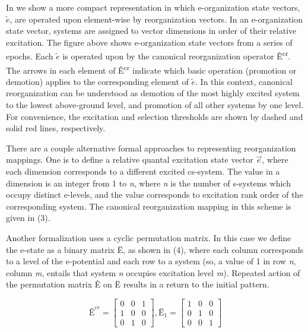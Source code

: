   In {} we show a more compact representation in which e-organization state vectors,  $\widetilde{{e}}$, are operated upon element-wise by reorganization vectors. In an e-organization state vector, systems are assigned to vector dimensions in order of their relative excitation. The figure above shows e-organization state vectors from a series of epochs. Each  $\widetilde{{e}}$ is operated upon by the canonical reorganization operator Ê\textsuperscript{cr}. The arrows in each element of Ê\textsuperscript{cr} indicate which basic operation (promotion or demotion) applies to the corresponding element of  $\widetilde{{e}}$. In this context, canonical reorganization can be understood as demotion of the most highly excited system to the lowest above-ground level, and promotion of all other systems by one level. For convenience, the excitation and selection thresholds are shown by dashed and solid red lines, respectively.

  There are a couple alternative formal approaches to representing reorganization mappings. One is to define a relative quantal excitation state vector  $\overrightarrow{{e}}$, where each dimension corresponds to a different excited cs-system. The value in a dimension is an integer from 1 to \textit{n}, where \textit{n} is the number of s-systems which occupy distinct e-levels, and the value corresponds to excitation rank order of the corresponding system. The canonical reorganization mapping in this scheme is given in (3).


  Another formalization uses a cyclic permutation matrix. In this case we define the e-state as a binary matrix Ë, as shown in (4), where each column corresponds to a level of the e-potential and each row to a system (so, a value of 1 in row \textit{n}, column \textit{m}, entails that system \textit{n} occupies excitation level \textit{m}). Repeated action of the permutation matrix Ê on Ë results in a return to the initial pattern. 

\ea
$$
\text{Ê}^{{cr}}=
\left[
  \begin{matrix}
  0 & 0 & 1\\
  1 & 0 & 0\\
  0 & 1 & 0
  \end{matrix}
\right],
{\text{Ë}}_{1}=
\left[
  \begin{matrix}
  1 & 0 & 0\\
  0 & 1 & 0\\
  0 & 0 & 1
  \end{matrix}
\right]
$$
\z


